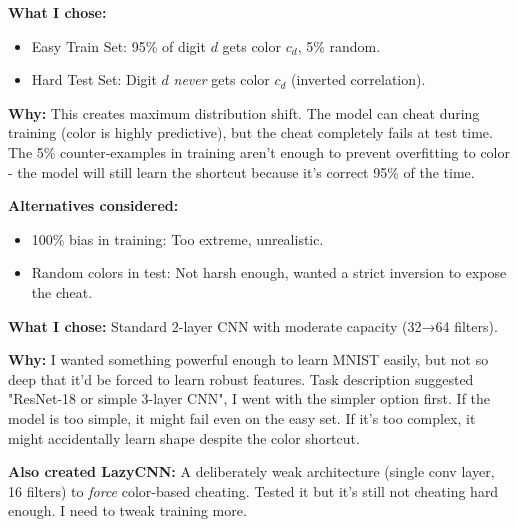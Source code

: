 \documentclass[9pt,a4paper,twocolumn,twoside]{tau-class/tau}
\begin{document}
        \begin{tauenv}[frametitle={Decision: 95\% Bias in Training, 0\% in Testing}]
            \textbf{What I chose:} 
            \begin{itemize}
                \item Easy Train Set: 95\% of digit $d$ gets color $c_d$, 5\% random.
                \item Hard Test Set: Digit $d$ \textit{never} gets color $c_d$ (inverted correlation).
            \end{itemize}
            
            \textbf{Why:} This creates maximum distribution shift. The model can cheat during training (color is highly predictive), but the cheat completely fails at test time. The 5\% counter-examples in training aren't enough to prevent overfitting to color - the model will still learn the shortcut because it's correct 95\% of the time.
            
            \textbf{Alternatives considered:} 
            \begin{itemize}
                \item 100\% bias in training: Too extreme, unrealistic.
                \item Random colors in test: Not harsh enough, wanted a strict inversion to expose the cheat.
            \end{itemize}
        \end{tauenv}
        
        \begin{tauenv}[frametitle=Decision: SimpleCNN Architecture]
            \textbf{What I chose:} Standard 2-layer CNN with moderate capacity (32→64 filters).
            
            \textbf{Why:} I wanted something powerful enough to learn MNIST easily, but not so deep that it'd be forced to learn robust features. Task description suggested "ResNet-18 or simple 3-layer CNN", I went with the simpler option first. If the model is too simple, it might fail even on the easy set. If it's too complex, it might accidentally learn shape despite the color shortcut.
            
            \textbf{Also created LazyCNN:} A deliberately weak architecture (single conv layer, 16 filters) to \textit{force} color-based cheating. Tested it but it's still not cheating hard enough. I need to tweak training more.
        \end{tauenv}
        
\end{document}
